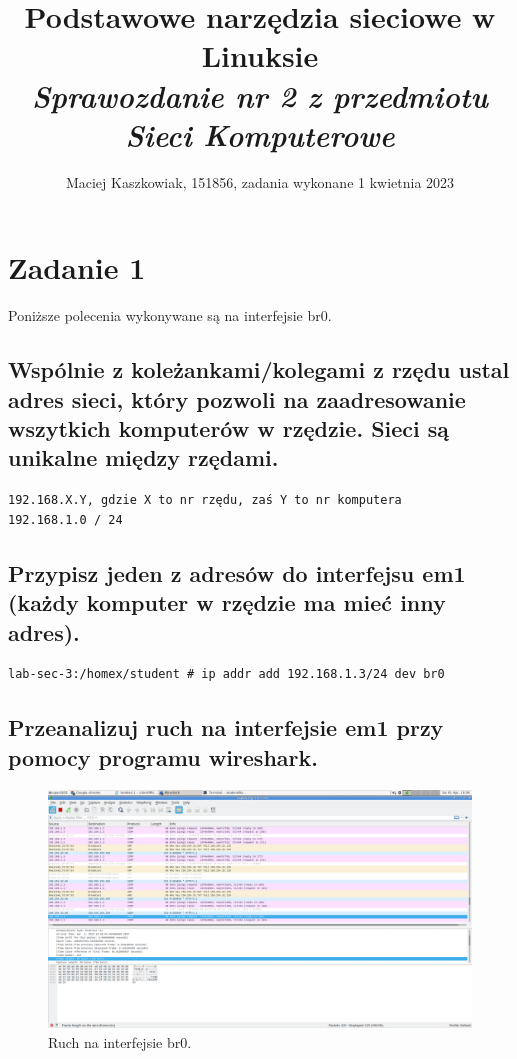 \documentclass[polish, a4paper]{article}
\title{Podstawowe narzędzia sieciowe w Linuksie \\
        \Large \emph{Sprawozdanie nr 2 z przedmiotu Sieci Komputerowe}}
\author{Maciej Kaszkowiak, 151856, zadania wykonane 1 kwietnia 2023}
\date{\vspace{-5ex}} %
\begin{document}
\maketitle

\tableofcontents

\newpage

\section{Zadanie 1}
Poniższe polecenia wykonywane są na interfejsie br0.

\subsection{Wspólnie z koleżankami/kolegami z rzędu ustal adres sieci, który pozwoli na zaadresowanie wszytkich komputerów w rzędzie. Sieci są unikalne między rzędami.}

\begin{verbatim}
192.168.X.Y, gdzie X to nr rzędu, zaś Y to nr komputera
192.168.1.0 / 24
\end{verbatim}
\subsection{Przypisz jeden z adresów do interfejsu em1 (każdy komputer w rzędzie ma mieć inny adres).}

\begin{verbatim}
lab-sec-3:/homex/student # ip addr add 192.168.1.3/24 dev br0
\end{verbatim}

\subsection{Przeanalizuj ruch na interfejsie em1 przy pomocy programu wireshark.}

\begin{figure}[H]
\centering
\includegraphics[width=\textwidth]{zdj1.png}
\caption{Ruch na interfejsie br0.}
\end{figure}
\end{document}
